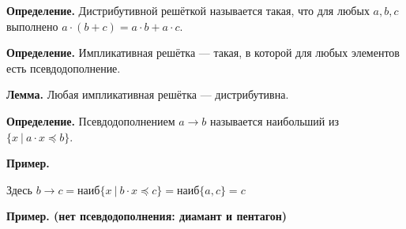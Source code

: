 \documentclass[10pt,a4paper,oneside]{article}
\begin{document}
\noindent \textbf{ Определение. } 
Дистрибутивной решёткой называется такая, что для любых $a,b,c$ выполнено
$a \cdot (b + c) = a \cdot b + a \cdot c$.

\noindent \textbf{ Определение. } 
Импликативная решётка --- такая, в которой для любых элементов есть псевдодополнение.

\noindent \textbf{ Лемма. } 
Любая импликативная решётка --- дистрибутивна.

\noindent \textbf{ Определение. }
Псевдодополнением $a \rightarrow b$ называется наибольший из $\{ x \ |\ a \cdot x \preceq b\}$.

\noindent \textbf{ Пример. } 

\begin{center}\end{center}

Здесь $b \rightarrow c = \text{наиб}\{x\ |\ b \cdot x \preceq c\} = \text{наиб}\{ a, c \} = c$


\noindent \textbf{ Пример. (нет псевдодополнения: диамант и пентагон)}
\end{document}
